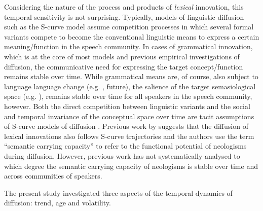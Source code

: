 \documentclass[
  a4paper,
  abstract=on,
  captions=tableabove
  ]{scrartcl}
\begin{document}
    Considering the nature of the process and products of \emph{lexical} innovation, this temporal sensitivity is not surprising. Typically, models of linguistic diffusion such as the S-curve model assume competition processes in which several formal variants compete to become the conventional linguistic means to express a certain meaning/function in the speech community. In cases of grammatical innovation, which is at the core of most models and previous empirical investigations of diffusion, the communicative need for expressing the target concept/function remains stable over time. While grammatical means are, of course, also subject to language language change (e.g. ,  future), the salience of the target semasiological space (e.g. ), remains stable over time for all speakers in the speech community, however. Both the direct competition between linguistic variants and the social and temporal invariance of the conceptual space over time are tacit assumptions of S-curve models of diffusion \parencite{Blythe2012ScurvesMechanisms}. Previous work by \cite{Nini2017ApplicationGrowth} suggests that the diffusion of lexical innovations also follows S-curve trajectories and the authors use the term \enquote{semantic carrying capacity} to refer to the functional potential of neologisms during diffusion. However, previous work has not systematically analysed to which degree the semantic carrying capacity of neologisms is stable over time and across communities of speakers.

    The present study investigated three aspects of the temporal dynamics of diffusion: trend, age and volatility.
\end{document}
